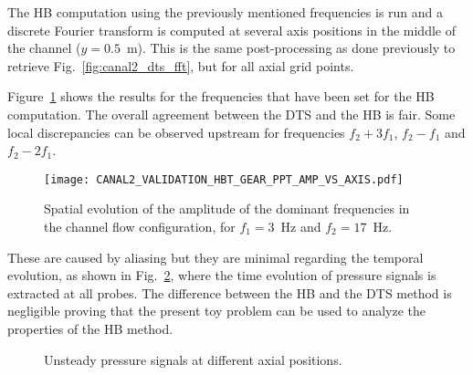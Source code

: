 The HB computation using the previously mentioned frequencies is
run and a discrete Fourier transform is computed at several axis positions
in the middle of the channel ($y=0.5$~m). 
This is the same post-processing as done previously to retrieve 
Fig.~\ref{fig:canal2_dts_fft}, but for all axial grid points.

Figure~\ref{fig:canal2_validation_hbt_gear_amp_vs_axis}
shows the results for the frequencies that have been set for the HB computation.
The overall agreement between the DTS and the HB is fair.  
Some local discrepancies can be
observed upstream for frequencies $f_2 + 3f_1$, $f_2 - f_1$ and $f_2 -
2f_1$. 
\begin{figure}[htp]
  \centering
  \texttt{[image: CANAL2\_VALIDATION\_HBT\_GEAR\_PPT\_AMP\_VS\_AXIS.pdf]}
  \caption{Spatial evolution of the amplitude of the dominant
    frequencies in the channel flow configuration, for $f_1 = 3$~Hz and $f_2 = 17$~Hz.}
  \label{fig:canal2_validation_hbt_gear_amp_vs_axis}
\end{figure}
These are caused by aliasing
but they are minimal regarding the temporal evolution, as
shown in Fig.~\ref{fig:canal2_validation_hbt_gear_time_ev}, where the
time evolution of pressure signals is extracted at all probes.  The
difference between the HB and the DTS method is negligible proving
that the present toy problem can be used to analyze the properties of 
the HB method.
\begin{figure}[htp]
  \centering 
   \quad{}
  \caption{Unsteady pressure signals at different axial positions.}
  \label{fig:canal2_validation_hbt_gear_time_ev}
\end{figure}
